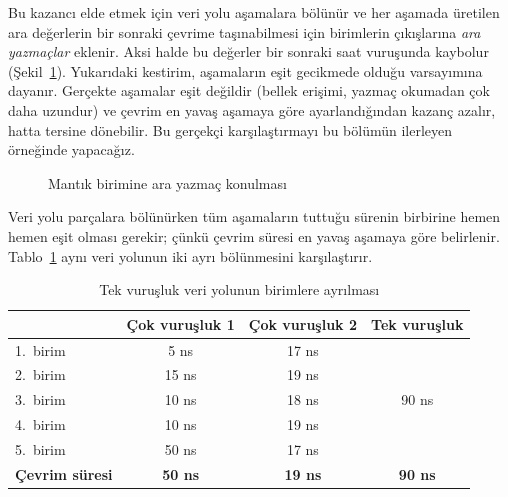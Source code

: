Bu kazancı elde etmek için veri yolu aşamalara bölünür ve her aşamada üretilen ara değerlerin bir sonraki çevrime taşınabilmesi için birimlerin çıkışlarına \emph{ara yazmaçlar} eklenir. Aksi halde bu değerler bir sonraki saat vuruşunda kaybolur (Şekil~\ref{fig:ara-yazmac}). Yukarıdaki kestirim, aşamaların eşit gecikmede olduğu varsayımına dayanır. Gerçekte aşamalar eşit değildir (bellek erişimi, yazmaç okumadan çok daha uzundur) ve çevrim en yavaş aşamaya göre ayarlandığından kazanç azalır, hatta tersine dönebilir. Bu gerçekçi karşılaştırmayı bu bölümün ilerleyen örneğinde yapacağız.

\begin{figure}[htbp]
\centering
{}
\caption{Mantık birimine ara yazmaç konulması}
\label{fig:ara-yazmac}
\end{figure}

Veri yolu parçalara bölünürken tüm aşamaların tuttuğu sürenin birbirine hemen hemen eşit olması gerekir; çünkü çevrim süresi en yavaş aşamaya göre belirlenir. Tablo~\ref{tab:veriyolu-bolme} aynı veri yolunun iki ayrı bölünmesini karşılaştırır.

\begin{table}[htbp]
\centering
\caption{Tek vuruşluk veri yolunun birimlere ayrılması}
\label{tab:veriyolu-bolme}
\begin{tabular}{lccc}
\toprule
 & \textbf{Çok vuruşluk 1} & \textbf{Çok vuruşluk 2} & \textbf{Tek vuruşluk} \\
\midrule
1.\ birim & 5 ns & 17 ns & \multirow{5}{*}{90 ns} \\
2.\ birim & 15 ns & 19 ns & \\
3.\ birim & 10 ns & 18 ns & \\
4.\ birim & 10 ns & 19 ns & \\
5.\ birim & 50 ns & 17 ns & \\
\midrule
\textbf{Çevrim süresi} & \textbf{50 ns} & \textbf{19 ns} & \textbf{90 ns} \\
\bottomrule
\end{tabular}
\end{table}

